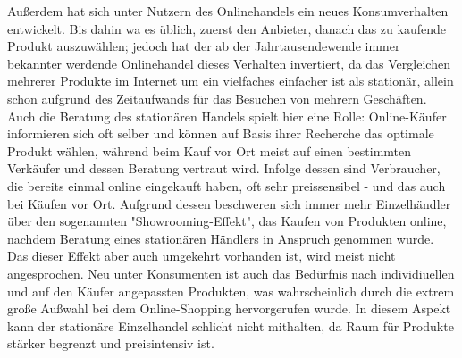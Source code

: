 \begin{folding}
Außerdem hat sich unter Nutzern des Onlinehandels ein neues Konsumverhalten entwickelt. Bis dahin wa es üblich, zuerst den Anbieter, danach das zu kaufende Produkt auszuwählen; jedoch hat der ab der Jahrtausendewende immer bekannter werdende Onlinehandel dieses Verhalten invertiert, da das Vergleichen mehrerer Produkte im Internet um ein vielfaches einfacher ist als stationär, allein schon aufgrund des Zeitaufwands für das Besuchen von mehrern Geschäften\cite[S 22f]{Graf}. Auch die Beratung des stationären Handels spielt hier eine Rolle: Online-Käufer informieren sich oft selber und können auf Basis ihrer Recherche das optimale Produkt wählen, während beim Kauf vor Ort meist auf einen bestimmten Verkäufer und dessen Beratung vertraut wird\cite[S. 15f]{evilcom}. Infolge dessen sind Verbraucher, die bereits einmal online eingekauft haben, oft sehr preissensibel - und das auch bei Käufen vor Ort\cite[S. 60]{Nitt}. Aufgrund dessen beschweren sich immer mehr Einzelhändler über den sogenannten "Showrooming-Effekt", das Kaufen von Produkten online, nachdem Beratung eines stationären Händlers in Anspruch genommen wurde. Das dieser Effekt aber auch umgekehrt vorhanden ist, wird meist nicht angesprochen\cite[S. 21f]{evilcom}.
Neu unter Konsumenten ist auch das Bedürfnis nach individiuellen und auf den Käufer angepassten Produkten\cite[S. 43]{Nitt}, was wahrscheinlich durch die extrem große Außwahl bei dem Online-Shopping hervorgerufen wurde. In diesem Aspekt kann der stationäre Einzelhandel schlicht nicht mithalten, da Raum für Produkte stärker begrenzt und preisintensiv ist.

\end{folding}


